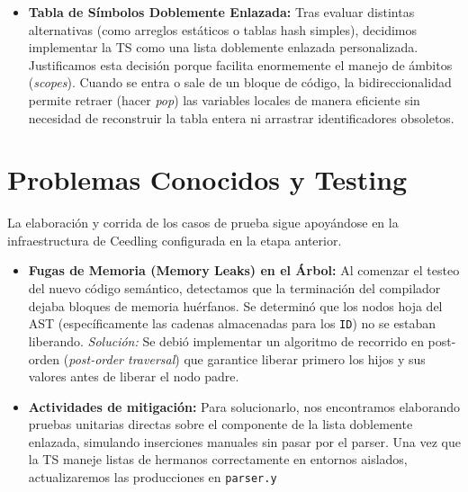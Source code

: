 \documentclass[11pt, a4paper]{article}
\begin{document}
\begin{itemize}
    \item \textbf{Tabla de Símbolos Doblemente Enlazada:} Tras evaluar distintas alternativas (como arreglos estáticos o tablas hash simples), decidimos implementar la TS como una lista doblemente enlazada personalizada. Justificamos esta decisión porque facilita enormemente el manejo de ámbitos (\textit{scopes}). Cuando se entra o sale de un bloque de código, la bidireccionalidad permite retraer (hacer \textit{pop}) las variables locales de manera eficiente sin necesidad de reconstruir la tabla entera ni arrastrar identificadores obsoletos.
\end{itemize}


\section{Problemas Conocidos y Testing}
La elaboración y corrida de los casos de prueba sigue apoyándose en la infraestructura de Ceedling configurada en la etapa anterior.

\begin{itemize}
    \item \textbf{Fugas de Memoria (Memory Leaks) en el Árbol:} Al comenzar el testeo del nuevo código semántico, detectamos que la terminación del compilador dejaba bloques de memoria huérfanos. Se determinó que los nodos hoja del AST (específicamente las cadenas almacenadas para los \texttt{ID}) no se estaban liberando. \textit{Solución:} Se debió implementar un algoritmo de recorrido en post-orden (\textit{post-order traversal}) que garantice liberar primero los hijos y sus valores antes de liberar el nodo padre.
    \item \textbf{Actividades de mitigación:} Para solucionarlo, nos encontramos elaborando pruebas unitarias directas sobre el componente de la lista doblemente enlazada, simulando inserciones manuales sin pasar por el parser. Una vez que la TS maneje listas de hermanos correctamente en entornos aislados, actualizaremos las producciones en \texttt{parser.y}
\end{itemize}
\end{document}
